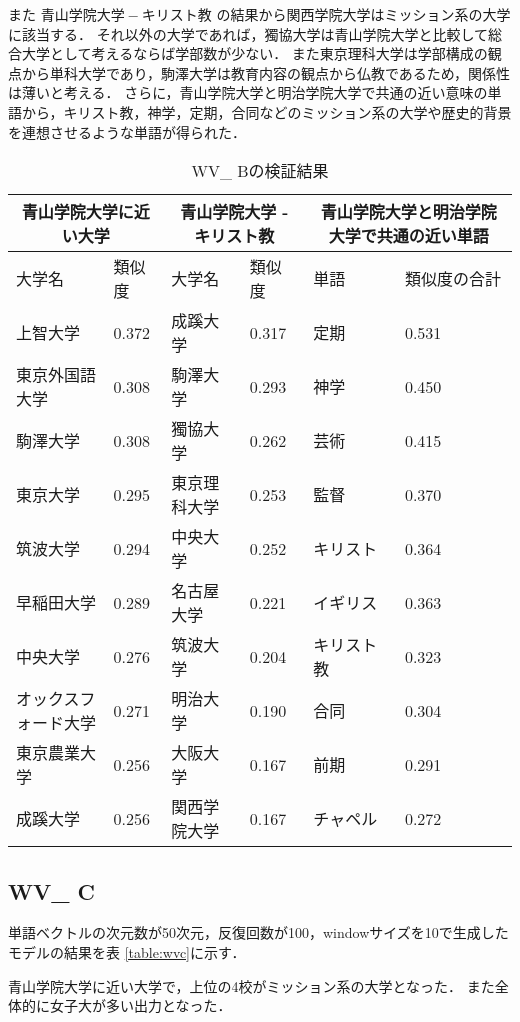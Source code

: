 また $ 青山学院大学 - キリスト教 $ の結果から関西学院大学はミッション系の大学に該当する．
それ以外の大学であれば，獨協大学は青山学院大学と比較して総合大学として考えるならば学部数が少ない．
また東京理科大学は学部構成の観点から単科大学であり，駒澤大学は教育内容の観点から仏教であるため，関係性は薄いと考える．
さらに，青山学院大学と明治学院大学で共通の近い意味の単語から，キリスト教，神学，定期，合同などのミッション系の大学や歴史的背景を連想させるような単語が得られた．

\begin{table}[H]
\caption{WV\_ Bの検証結果}
\centering
\footnotesize
\begin{tabular}{ll|ll|ll}
\hline
\multicolumn{2}{c}{青山学院大学に近い大学} & \multicolumn{2}{c}{青山学院大学 - キリスト教} & \multicolumn{2}{c}{青山学院大学と明治学院大学で共通の近い単語}
\\ \hline
大学名 & 類似度 & 大学名 & 類似度 & 単語 & 類似度の合計
\\ \hline \hline
上智大学 & 0.372 & 成蹊大学 & 0.317 & 定期 & 0.531\\
東京外国語大学 & 0.308 & 駒澤大学 & 0.293 & 神学 & 0.450\\
駒澤大学 & 0.308 & 獨協大学 & 0.262 & 芸術 & 0.415\\
東京大学 & 0.295 & 東京理科大学 & 0.253 & 監督 & 0.370\\
筑波大学 & 0.294 & 中央大学 & 0.252 & キリスト & 0.364\\
早稲田大学 & 0.289 & 名古屋大学 & 0.221 & イギリス & 0.363\\
中央大学 & 0.276 & 筑波大学 & 0.204 & キリスト教 & 0.323\\
オックスフォード大学 & 0.271 & 明治大学 & 0.190 & 合同 & 0.304\\
東京農業大学 & 0.256 & 大阪大学 & 0.167 & 前期 & 0.291\\
成蹊大学 & 0.256 & 関西学院大学 & 0.167 & チャペル & 0.272\\ \hline
\end{tabular}
\label{table:wvb}
\end{table}


\subsection{WV\_ C}
単語ベクトルの次元数が50次元，反復回数が100，windowサイズを10で生成したモデルの結果を表 \ref{table:wvc}に示す．

青山学院大学に近い大学で，上位の4校がミッション系の大学となった．
また全体的に女子大が多い出力となった．

